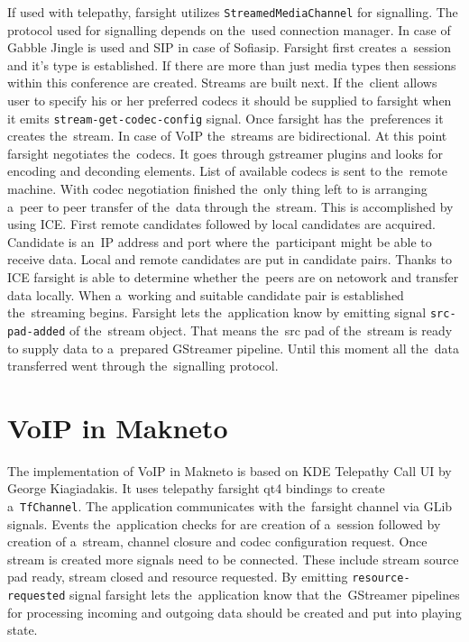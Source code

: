 If used with telepathy, farsight utilizes \verb|StreamedMediaChannel| for signalling. The protocol used for signalling depends on the~used connection manager. In case of Gabble Jingle is used and SIP in case of Sofiasip. Farsight first creates a~session and it's type is established. If there are more than just media types then sessions within this conference are created. Streams are built next. If the~client allows user to specify his or her preferred codecs it should be supplied to farsight when it emits \verb|stream-get-codec-config| signal. Once farsight has the~preferences it creates the~stream. In case of VoIP the~streams are bidirectional. At this point farsight negotiates the~codecs. It goes through gstreamer plugins and looks for encoding and deconding elements. List of available codecs is sent to the~remote machine. With codec negotiation finished the~only thing left to is arranging a~peer to peer transfer of the~data through the~stream. This is accomplished by using ICE. First remote candidates followed by local candidates are acquired. Candidate is an~IP address and port where the~participant might be able to receive data. Local and remote candidates are put in candidate pairs. Thanks to ICE farsight is able to determine whether the~peers are on netowork and transfer data locally. When a~working and suitable candidate pair is established the~streaming begins. Farsight lets the~application know by emitting signal \verb|src-pad-added| of the~stream object. That means the~src pad of the~stream is ready to supply data to a~prepared GStreamer pipeline. Until this moment all the~data transferred went through the~signalling protocol. 


\section{VoIP in Makneto}
The implementation of VoIP in Makneto is based on KDE Telepathy Call UI \cite{kdeTpCallUI} by George Kiagiadakis. It uses telepathy farsight qt4 bindings to create a~\verb|TfChannel|. The application communicates with the~farsight channel via GLib signals. Events the~application checks for are creation of a~session followed by creation of a~stream, channel closure and codec configuration request. Once stream is created more signals need to be connected. These include stream source pad ready, stream closed and resource requested. By emitting \verb|resource-requested| signal farsight lets the~application know that the~GStreamer pipelines for processing incoming and outgoing data should be created and put into playing state. 

